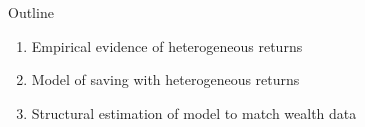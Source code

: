 \documentclass{beamer}
\begin{document}




    


\begin{frame}{Outline}
\begin{enumerate}
\item Empirical evidence of heterogeneous returns
\item Model of saving with heterogeneous returns
\item Structural estimation of model to match wealth data
\end{enumerate}

\end{frame}

\end{document}
